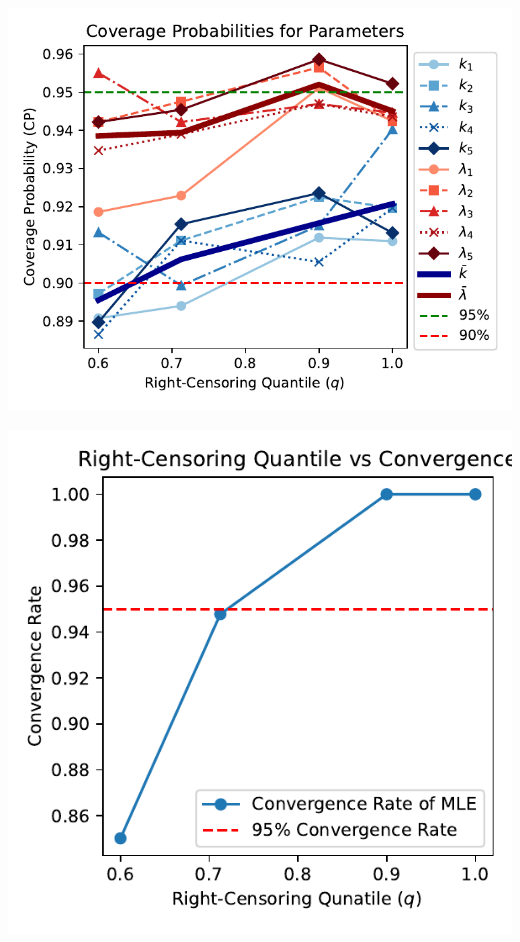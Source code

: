 \documentclass{article}
\begin{document}

\noindent
\begin{minipage}[t]{0.55\textwidth}
  \centering
  \includegraphics[width=\textwidth,height=0.33\textheight,keepaspectratio]{plot-q-vs-cp.pdf}
\end{minipage}%
\begin{minipage}[t]{0.4\textwidth}
  \centering
  \includegraphics[width=\textwidth,height=0.33\textheight,keepaspectratio]{q_vs_convergence.pdf}
\end{minipage}
\end{document}
